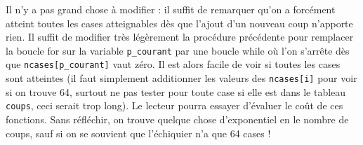 

\Q
Il n'y a pas grand chose à modifier : il suffit de remarquer qu'on a forcément atteint toutes les cases atteignables dès que l'ajout d'un nouveau coup n'apporte rien. Il suffit de modifier très légèrement la procédure précédente pour remplacer la boucle \og for \fg{} sur la variable \texttt{p\_courant} par une boucle \og while \fg{} où l'on s'arrête dès que \texttt{ncases[p\_courant]} vaut zéro. Il est alors facile de voir si toutes les cases sont atteintes (il faut simplement additionner les valeurs des \texttt{ncases[i]} pour voir si on trouve 64, surtout ne pas tester pour toute case si elle est dans le tableau \texttt{coups}, ceci serait trop long). Le lecteur pourra essayer d'évaluer le coût de ces fonctions. Sans réfléchir, on trouve quelque chose d'exponentiel en le nombre de coups, sauf si on se souvient que l'échiquier n'a que 64 cases !

\Fin
